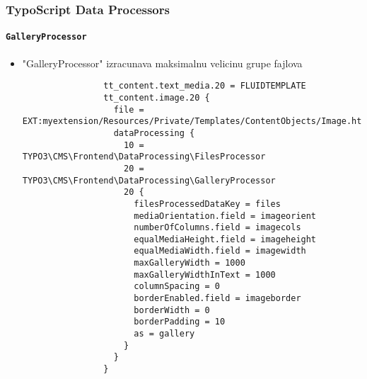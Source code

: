 \begin{frame}[fragile]
	\frametitle{TypoScript Data Processors}
	\framesubtitle{\texttt{GalleryProcessor}}

	\lstset{basicstyle=\tiny\ttfamily}

	\begin{itemize}


		\item "GalleryProcessor" izracunava maksimalnu velicinu grupe fajlova

			\begin{lstlisting}
				tt_content.text_media.20 = FLUIDTEMPLATE
				tt_content.image.20 {
				  file = EXT:myextension/Resources/Private/Templates/ContentObjects/Image.html
				  dataProcessing {
				    10 = TYPO3\CMS\Frontend\DataProcessing\FilesProcessor
				    20 = TYPO3\CMS\Frontend\DataProcessing\GalleryProcessor
				    20 {
				      filesProcessedDataKey = files
				      mediaOrientation.field = imageorient
				      numberOfColumns.field = imagecols
				      equalMediaHeight.field = imageheight
				      equalMediaWidth.field = imagewidth
				      maxGalleryWidth = 1000
				      maxGalleryWidthInText = 1000
				      columnSpacing = 0
				      borderEnabled.field = imageborder
				      borderWidth = 0
				      borderPadding = 10
				      as = gallery
				    }
				  }
				}
			\end{lstlisting}

	\end{itemize}

\end{frame}


